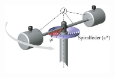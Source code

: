 \begin{center}
	\begin{minipage}{0.3\textwidth}
	\end{minipage}%
	\begin{minipage}{0.3\textwidth}
		\includegraphics[height=3cm,keepaspectratio=true]{Images/drehpendel.png}
	\end{minipage}
\end{center}
\begin{center}
	\begin{minipage}{0.3\textwidth}
		 \\
		 \\
	\end{minipage}%
	\begin{minipage}{0.3\textwidth}
		 \\
		 \\
		 \\
	\end{minipage}
\end{center}






